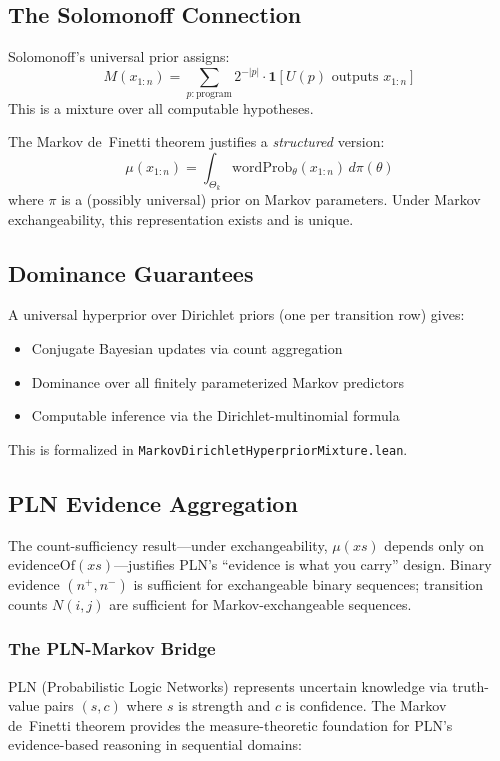 \documentclass[11pt,a4paper]{article}
\theoremstyle{definition}
\begin{document}
\subsection{The Solomonoff Connection}

Solomonoff's universal prior assigns:
\[
M(x_{1:n}) = \sum_{p : \text{program}} 2^{-|p|} \cdot \mathbf{1}[U(p) \text{ outputs } x_{1:n}]
\]
This is a mixture over all computable hypotheses.

The Markov de~Finetti theorem justifies a \emph{structured} version:
\[
\mu(x_{1:n}) = \int_{\Theta_k} \mathrm{wordProb}_\theta(x_{1:n}) \, d\pi(\theta)
\]
where $\pi$ is a (possibly universal) prior on Markov parameters. Under
Markov exchangeability, this representation exists and is unique.

\subsection{Dominance Guarantees}

A universal hyperprior over Dirichlet priors (one per transition row) gives:
\begin{itemize}
\item Conjugate Bayesian updates via count aggregation
\item Dominance over all finitely parameterized Markov predictors
\item Computable inference via the Dirichlet-multinomial formula
\end{itemize}

This is formalized in \texttt{MarkovDirichletHyperpriorMixture.lean}.

\subsection{PLN Evidence Aggregation}

The count-sufficiency result---under exchangeability, $\mu(xs)$ depends only
on $\mathrm{evidenceOf}(xs)$---justifies PLN's ``evidence is what you carry''
design. Binary evidence $(n^+, n^-)$ is sufficient for exchangeable binary
sequences; transition counts $N(i,j)$ are sufficient for Markov-exchangeable
sequences.

\subsubsection{The PLN-Markov Bridge}

PLN (Probabilistic Logic Networks) represents uncertain knowledge via
truth-value pairs $(s, c)$ where $s$ is strength and $c$ is confidence.
The Markov de~Finetti theorem provides the measure-theoretic foundation
for PLN's evidence-based reasoning in sequential domains:
\end{document}
